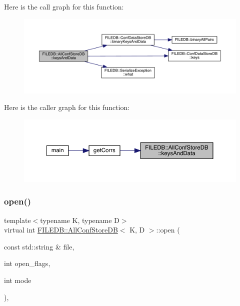 Here is the call graph for this function\+:
\nopagebreak
\begin{figure}[H]
\begin{center}
\leavevmode
\includegraphics[width=350pt]{df/db6/classFILEDB_1_1AllConfStoreDB_a9150983c712d6b870a75886f92b10a9d_cgraph}
\end{center}
\end{figure}
Here is the caller graph for this function\+:
\nopagebreak
\begin{figure}[H]
\begin{center}
\leavevmode
\includegraphics[width=350pt]{df/db6/classFILEDB_1_1AllConfStoreDB_a9150983c712d6b870a75886f92b10a9d_icgraph}
\end{center}
\end{figure}
\mbox{\label{classFILEDB_1_1AllConfStoreDB_aa6e6deb3c33076d16db4ac0560f0d75f}} 
\subsubsection{\texorpdfstring{open()}{open()}\hspace{0.1cm}{\footnotesize\ttfamily [1/3]}}
{\footnotesize\ttfamily template$<$typename K, typename D$>$ \\
virtual int \mbox{\hyperlink{classFILEDB_1_1AllConfStoreDB}{F\+I\+L\+E\+D\+B\+::\+All\+Conf\+Store\+DB}}$<$ K, D $>$\+::open (\begin{DoxyParamCaption}\item[{const std\+::string \&}]{file,  }\item[{int}]{open\+\_\+flags,  }\item[{int}]{mode }\end{DoxyParamCaption})\hspace{0.3cm}{\ttfamily [inline]}, {\ttfamily [virtual]}}

